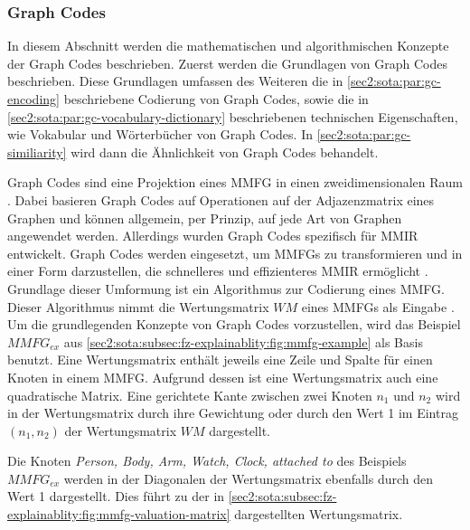 \subsubsection{Graph Codes}
\label{sec2:sota:subsubsec:graph-codes}
In diesem Abschnitt werden die mathematischen und algorithmischen Konzepte der Graph Codes beschrieben.
Zuerst werden die Grundlagen von Graph Codes beschrieben.
Diese Grundlagen umfassen des Weiteren die in \cref{sec2:sota:par:gc-encoding} beschriebene Codierung von Graph Codes, sowie die in \cref{sec2:sota:par:gc-vocabulary-dictionary} beschriebenen technischen Eigenschaften, wie Vokabular und Wörterbücher von Graph Codes.
In \cref{sec2:sota:par:gc-similiarity} wird dann die Ähnlichkeit von Graph Codes behandelt.

Graph Codes sind eine Projektion eines MMFG in einen zweidimensionalen Raum \cite{gc-2d-proj-mmfg}.
Dabei basieren Graph Codes auf Operationen auf der Adjazenzmatrix eines Graphen und können allgemein, per Prinzip, auf jede Art von Graphen angewendet werden.
Allerdings wurden Graph Codes spezifisch für MMIR entwickelt.
Graph Codes werden eingesetzt, um MMFGs zu transformieren und in einer Form darzustellen, die schnelleres und effizienteres MMIR ermöglicht \cite{fast-effec-retr-large-collec}.
Grundlage dieser Umformung ist ein Algorithmus zur Codierung eines MMFG.
Dieser Algorithmus nimmt die Wertungsmatrix $WM$ eines MMFGs als Eingabe \cite{gc-2d-proj-mmfg}.
Um die grundlegenden Konzepte von Graph Codes vorzustellen, wird das Beispiel $MMFG_{ex}$ aus \cref{sec2:sota:subsec:fz-explainablity:fig:mmfg-example} als Basis benutzt.
Eine Wertungsmatrix enthält jeweils eine Zeile und Spalte für einen Knoten in einem MMFG.
Aufgrund dessen ist eine Wertungsmatrix auch eine quadratische Matrix.
Eine gerichtete Kante zwischen zwei Knoten $n_1$ und $n_2$ wird in der Wertungsmatrix durch ihre Gewichtung oder durch den Wert 1 im Eintrag $(n_1,n_2)$ der Wertungsmatrix $WM$ dargestellt.

Die Knoten \textit{Person, Body, Arm, Watch, Clock, attached to} des Beispiels $MMFG_{ex}$ werden in der Diagonalen der Wertungsmatrix ebenfalls durch den Wert 1 dargestellt.
Dies führt zu der in \cref{sec2:sota:subsec:fz-explainablity:fig:mmfg-valuation-matrix} dargestellten Wertungsmatrix.


